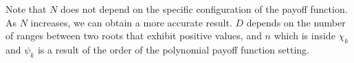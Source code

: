 Note that $N$ does not depend on the specific configuration of the payoff function. As $N$ increases, we can obtain a more accurate result. $D$ depends on the number of ranges between two roots that exhibit positive values, and $n$ which is inside $\chi_k$ and $\psi_k$ is a result of the order of the polynomial payoff function setting.\\